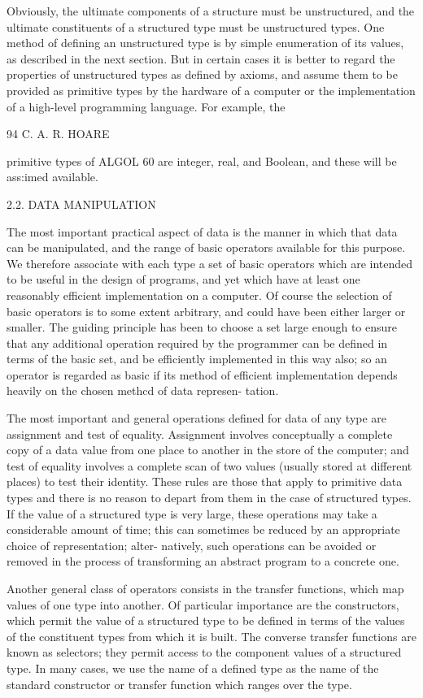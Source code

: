 Obviously, the ultimate components of a structure must be unstructured, and the ultimate constituents of a structured type must be unstructured types. One method of defining an unstructured type is by simple enumeration of its values, as described in the next section. But in certain cases it is better to regard the properties of unstructured types as defined by axioms, and assume them to be provided as primitive types by the hardware of a computer or the implementation of a high-level programming language. For example, the

94 C. A. R. HOARE

primitive types of ALGOL 60 are integer, real, and Boolean, and these will be ass:imed available.

2.2. DATA MANIPULATION

The most important practical aspect of data is the manner in which that data can be manipulated, and the range of basic operators available for this purpose. We therefore associate with each type a set of basic operators which are intended to be useful in the design of programs, and yet which have at least one reasonably efficient implementation on a computer. Of course the selection of basic operators is to some extent arbitrary, and could have been either larger or smaller. The guiding principle has been to choose a set large enough to ensure that any additional operation required by the programmer can be defined in terms of the basic set, and be efficiently implemented in this way also; so an operator is regarded as basic if its method of efficient implementation depends heavily on the chosen methcd of data represen- tation.

The most important and general operations defined for data of any type are assignment and test of equality. Assignment involves conceptually a complete copy of a data value from one place to another in the store of the computer; and test of equality involves a complete scan of two values (usually stored at different places) to test their identity. These rules are those that apply to primitive data types and there is no reason to depart from them in the case of structured types. If the value of a structured type is very large, these operations may take a considerable amount of time; this can sometimes be reduced by an appropriate choice of representation; alter- natively, such operations can be avoided or removed in the process of transforming an abstract program to a concrete one.

Another general class of operators consists in the transfer functions, which map values of one type into another. Of particular importance are the constructors, which permit the value of a structured type to be defined in terms of the values of the constituent types from which it is built. The converse transfer functions are known as selectors; they permit access to the component values of a structured type. In many cases, we use the name of a defined type as the name of the standard constructor or transfer function which ranges over the type.

